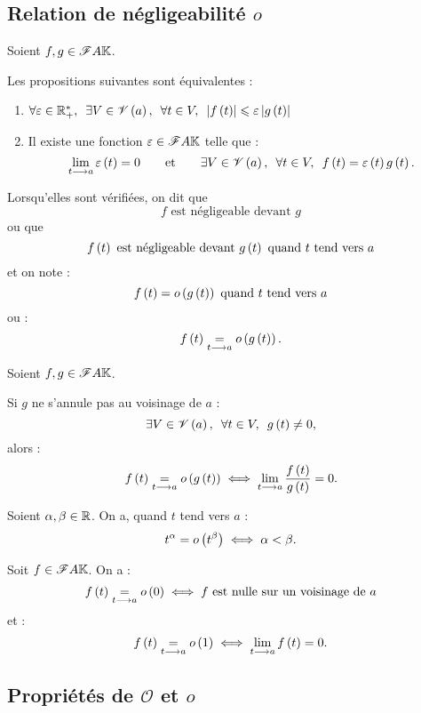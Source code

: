 \subsection{Relation de négligeabilité \(o\)}

\begin{defprop}
Soient \(f,g\in\mathscr{F}{A}{\mathbb{K}}\).

Les propositions suivantes sont équivalentes :

\begin{enumerate}
    \item \(\quantifs{\forall\epsilon\in\Rps;\exists V\in\V{a};\forall t\in V}\abs{f\paren{t}}\leq\epsilon\abs{g\paren{t}}\) \\
    \item Il existe une fonction \(\varepsilon\in\mathscr{F}{A}{\mathbb{K}}\) telle que : \[\lim_{t\to a}\epsilon\paren{t}=0\qquad\text{et}\qquad\quantifs{\exists V\in\V{a};\forall t\in V}f\paren{t}=\epsilon\paren{t}g\paren{t}.\]
\end{enumerate}

Lorsqu'elles sont vérifiées, on dit que \[f\text{ est négligeable devant }g\] ou que \[f\left(t\right)\text{ est négligeable devant }g\left(t\right)\text{ quand }t\text{ tend vers }a\] et on note : \[f\left(t\right)=o\left(g\left(t\right)\right)\text{ quand }t\text{ tend vers }a\] ou : \[f\left(t\right)\underset{t\longrightarrow a}{=}o\left(g\left(t\right)\right).\]
\end{defprop}

\begin{prop}
Soient \(f,g\in\mathscr{F}{A}{\mathbb{K}}\).

Si \(g\) ne s'annule pas au voisinage de \(a\) : \[\quantifs{\exists V\in\V{a};\forall t\in V}g\paren{t}\not=0,\] alors : \[f\left(t\right)\underset{t\longrightarrow a}{=}o\left(g\left(t\right)\right)\iff\lim_{t\longrightarrow a}\dfrac{f\left(t\right)}{g\left(t\right)}=0.\]
\end{prop}

\begin{ex}
Soient \(\alpha,\beta\in\mathbb{R}\). On a, quand \(t\) tend vers \(a\) : \[t^\alpha=o\left(t^\beta\right)\iff\alpha<\beta.\]

Soit \(f\in\mathscr{F}{A}{\mathbb{K}}\). On a : \[f\left(t\right)\underset{t\longrightarrow a}{=}o\left(0\right)\iff f\text{ est nulle sur un voisinage de }a\] et : \[f\left(t\right)\underset{t\longrightarrow a}{=}o\left(1\right)\iff\lim_{t\longrightarrow a}f\left(t\right)=0.\]
\end{ex}

\subsection{Propriétés de \(\mathscr{O}\) et \(o\)}

